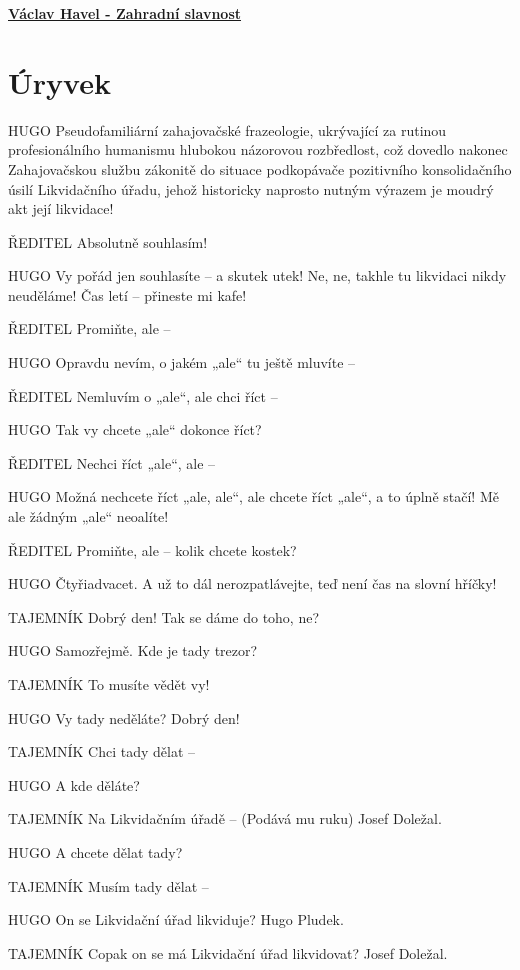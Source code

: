 \documentclass[11pt]{article}
\begin{document}
    \begin{center}
        \underline{\textbf{\Huge Václav Havel - Zahradní slavnost}}
    \end{center}
    \section*{Úryvek}
    HUGO Pseudofamiliární zahajovačské frazeologie, ukrývající za rutinou profesionálního humanismu hlubokou názorovou rozbředlost, což dovedlo nakonec Zahajovačskou službu zákonitě do situace podkopávače pozitivního konsolidačního úsilí Likvidačního úřadu, jehož historicky naprosto nutným výrazem je moudrý akt její likvidace!

    ŘEDITEL Absolutně souhlasím!

HUGO Vy pořád jen souhlasíte – a skutek utek! Ne, ne, takhle tu likvidaci nikdy neuděláme! Čas letí – přineste mi kafe!

ŘEDITEL Promiňte, ale –

HUGO Opravdu nevím, o jakém „ale“ tu ještě mluvíte –

ŘEDITEL Nemluvím o „ale“, ale chci říct –

HUGO Tak vy chcete „ale“ dokonce říct?

ŘEDITEL Nechci říct „ale“, ale –

HUGO Možná nechcete říct „ale, ale“, ale chcete říct „ale“, a to úplně stačí! Mě ale žádným „ale“ neoalíte!

ŘEDITEL Promiňte, ale – kolik chcete kostek?

HUGO Čtyřiadvacet. A už to dál nerozpatlávejte, teď není čas na slovní hříčky!

TAJEMNÍK Dobrý den! Tak se dáme do toho, ne?

HUGO Samozřejmě. Kde je tady trezor?

TAJEMNÍK To musíte vědět vy!

HUGO Vy tady neděláte? Dobrý den!

TAJEMNÍK Chci tady dělat –

HUGO A kde děláte?

TAJEMNÍK Na Likvidačním úřadě – (Podává mu ruku) Josef Doležal.

HUGO A chcete dělat tady?

TAJEMNÍK Musím tady dělat –

HUGO On se Likvidační úřad likviduje? Hugo Pludek.

TAJEMNÍK Copak on se má Likvidační úřad likvidovat? Josef Doležal.
\end{document}
